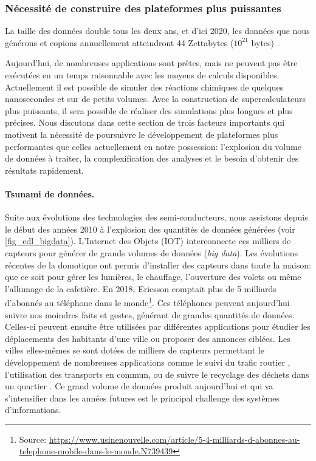          
    \subsubsection{Nécessité de construire des plateformes plus puissantes}\label{sec:3_motivations}

        \begin{fancyquotes}
        La taille des données double tous les deux ans, et d'ici 2020, les données que nous générons et copions annuellement atteindront 44 Zettabytes ($10^{21}$ bytes) \cite{Zhang2017}.
        \end{fancyquotes}
    
        Aujourd'hui, de nombreuses applications sont prêtes, mais ne peuvent pas être exécutées en un temps raisonnable avec les moyens de calculs disponibles. Actuellement il est possible de simuler des réactions chimiques de quelques nanosecondes et sur de petits volumes. Avec la construction de supercalculateurs plus puissants, il sera possible de réaliser des simulations plus longues et plus précises. Nous discutons dans cette section de trois facteurs importants qui motivent la nécessité de poursuivre le développement de plateformes plus performantes que celles actuellement en notre possession: l'explosion du volume de données à traiter, la complexification des analyses et le besoin d'obtenir des résultats rapidement.

        
        \paragraph{Tsunami de données.} 
            
            Suite aux évolutions des technologies des semi-conducteurs, nous assistons depuis le début des années 2010 à l'explosion des quantités de données générées (voir \autoref{fig_edl_bigdata}). L’Internet des Objets (IOT) interconnecte ces milliers de capteurs pour générer de grands volumes de données (\textit{big data}).  Les évolutions récentes de la domotique ont permis d'installer des capteurs dans toute la maison: que ce soit pour gérer les lumières, le chauffage, l'ouverture des volets ou même l'allumage de la cafetière. En 2018, Ericsson comptait plus de 5 milliards d'abonnés au téléphone dans le monde\footnote{Source: \url{https://www.usinenouvelle.com/article/5-4-milliards-d-abonnes-au-telephone-mobile-dans-le-monde.N739439}}. Ces téléphones peuvent aujourd'hui suivre nos moindres faits et gestes, générant de grandes quantités de données. Celles-ci peuvent ensuite être utilisées par différentes applications pour étudier les déplacements des habitants d'une ville ou proposer des annonces ciblées. Les villes elles-mêmes se sont dotées de milliers de capteurs permettant le développement de nombreuses applications comme le suivi du trafic routier \cite{bonhomme:hal-01334670}, l'utilisation des transports en commun, ou de suivre le recyclage des déchets dans un quartier \cite{Rebelles2018}. Ce grand volume de données produit aujourd'hui et qui va s'intensifier dans les années futures est le principal challenge des systèmes d'informations.
        
